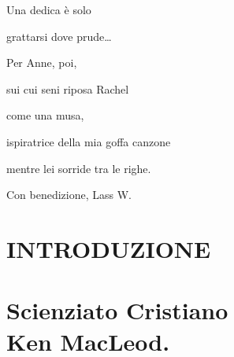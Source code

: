 	\begin{dedica}
		Una dedica è solo
		
		grattarsi dove prude\ldots{}
		
		Per Anne, poi,
		
		sui cui seni riposa Rachel
		
		come una musa,
		
		ispiratrice della mia goffa canzone
		
		mentre lei sorride tra le righe.
		
		Con benedizione, Lass W.
	\end{dedica}

\frontmatter

{ \chapter*{INTRODUZIONE}}
{ \chapter*{Scienziato Cristiano\\{\footnotesize Ken MacLeod.}}}
